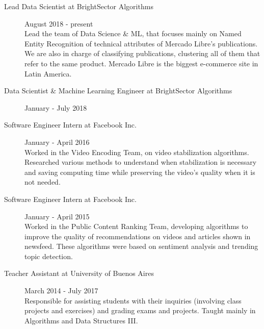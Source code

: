 \documentclass [a4paper, 11pt]{article}
\begin{document}
\begin{description}
  \item[Lead Data Scientist at BrightSector Algorithms] {\hfill August 2018 - present\\
    Lead the team of Data Science \& ML, that focuses mainly on Named Entity Recognition of technical 
    attributes of Mercado Libre's publications. We are also in charge of classifying publications, clustering
    all of them that refer to the same product. Mercado Libre is the biggest e-commerce site in Latin America.
  }

  \item[Data Scientist \& Machine Learning Engineer at BrightSector Algorithms] {\hfill January - July 2018\\
  }

  \item[Software Engineer Intern at Facebook Inc.] {\hfill January - April 2016\\
  Worked in the Video Encoding Team, on video stabilization algorithms. Researched various methods to 
  understand when stabilization is necessary and saving computing time while preserving the video's quality when it is not needed. 

}

  \item[Software Engineer Intern at Facebook Inc.] {\hfill January - April 2015\\
Worked in the Public Content Ranking Team, developing algorithms to improve the quality of recommendations on videos and articles shown in newsfeed. These algorithms were based on sentiment analysis and trending topic detection. %
}

  \item[Teacher Assistant at University of Buenos Aires] {\hfill March 2014 - July 2017\\
  Responsible for assisting students with their inquiries (involving class projects and 
  exercises) and grading exams and projects. Taught mainly in Algorithms 
  and Data Structures III.
}


\end{description}
\end{document}
